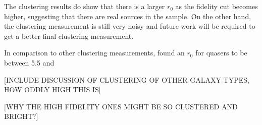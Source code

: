 The clustering results do show that there is a larger $r_0$ as the fidelity cut becomes higher, suggesting that there are real sources in the sample. On the other hand, the clustering measurement is still very noisy and future work will be required to get a better final clustering measurement. 

In comparison to other clustering measurements, \cite{hickox2011clustering} found an $r_0$ for quasers to be between 5.5 and 

[INCLUDE DISCUSSION OF CLUSTERING OF OTHER GALAXY TYPES, HOW ODDLY HIGH THIS IS]

[WHY THE HIGH FIDELITY ONES MIGHT BE SO CLUSTERED AND BRIGHT?]

